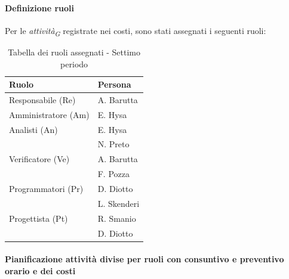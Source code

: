 \paragraph{Definizione ruoli}
Per le \textit{attività}\textsubscript{\textit{G}} registrate nei costi, sono stati assegnati i seguenti ruoli: 

\vspace{0.4cm}

\begin{table}[H]
    \centering
    \begin{tabular}{|L{4cm}|L{2cm}|}
        \hline
        \textbf{Ruolo} & \textbf{Persona} \\
        \hline
        \hline
        Responsabile (Re)   & A. Barutta \\
        \hline
        Amministratore (Am) & E. Hysa \\
        \hline
        Analisti (An)       & E. Hysa \\
                            & N. Preto \\
        \hline
        Verificatore (Ve)   & A. Barutta \\
                            & F. Pozza \\
        \hline
        Programmatori (Pr)  & D. Diotto\\
                            & L. Skenderi \\
        \hline
        Progettista (Pt)    & R. Smanio \\
                            & D. Diotto \\
        \hline
    \end{tabular}
    \caption{Tabella dei ruoli assegnati - Settimo periodo}
    \label{tab:Ruoli_persone_7}
    \end{table}

\newpage
\paragraph{Pianificazione attività divise per ruoli con consuntivo e preventivo orario e dei costi}

\vspace{0.4cm}

